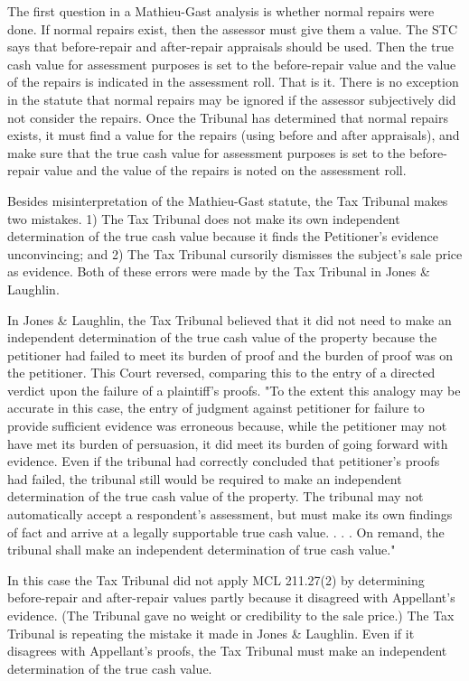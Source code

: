 The first question in a Mathieu-Gast analysis is whether normal repairs were done. If normal repairs exist, then the assessor must give them a value. The STC says that before-repair and after-repair appraisals should be used. Then the true cash value for assessment purposes is set to the before-repair value and the value of the repairs is indicated in the assessment roll. That is it. There is no exception in the statute that normal repairs may be ignored if the assessor subjectively did not consider the repairs. Once the Tribunal has determined that normal repairs exists, it must find a value for the repairs (using before and after appraisals), and make sure that the true cash value for assessment purposes is set to the before-repair value and the value of the repairs is noted on the assessment roll. 

Besides misinterpretation of the Mathieu-Gast statute, the Tax Tribunal makes two mistakes. 1) The Tax Tribunal does not make its own independent determination of the true cash value because it finds the Petitioner's evidence unconvincing; and 2) The Tax Tribunal cursorily dismisses the subject's sale price as evidence. Both of these errors were made by the Tax Tribunal in Jones & Laughlin. 

In Jones & Laughlin, the Tax Tribunal believed that it did not need to make an independent determination of the true cash value of the property because the petitioner had failed to meet its burden of proof and the burden of proof was on the petitioner. This Court reversed, comparing this to the entry of a directed verdict upon the failure of a plaintiff's proofs. "To the extent this analogy may be accurate in this case, the entry of judgment against petitioner for failure to provide sufficient evidence was erroneous because, while the petitioner may not have met its burden of persuasion, it did meet its burden of going forward with evidence. Even if the tribunal had correctly concluded that petitioner's proofs had failed, the tribunal still would be required to make an independent determination of the true cash value of the property. The tribunal may not automatically accept a respondent's assessment, but must make its own findings of fact and arrive at a legally supportable true cash value. . . . On remand, the tribunal shall make an independent determination of true cash value." 

In this case the Tax Tribunal did not apply MCL 211.27(2) by determining before-repair and after-repair values partly because it disagreed with Appellant's evidence. (The Tribunal gave no weight or credibility to the sale price.) The Tax Tribunal is repeating the mistake it made in Jones & Laughlin. Even if it disagrees with Appellant's proofs, the Tax Tribunal must make an independent determination of the true cash value. 

